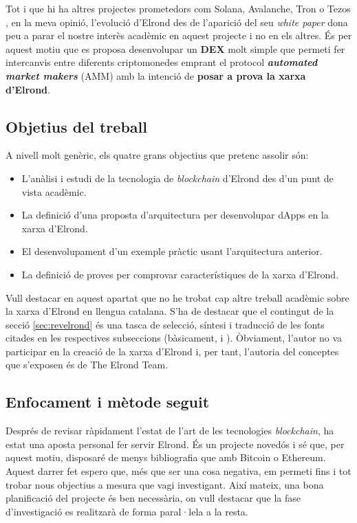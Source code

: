 \documentclass[11pt,a4paper]{article}
\begin{document}
Tot i que hi ha altres projectes prometedors com Solana, Avalanche, Tron o Tezos \cite{baro2021}, en la meva opinió, l'evolució d'Elrond des de l'aparició del seu \textit{white paper} dona peu a parar el nostre interès acadèmic en aquest projecte i no en els altres. És per aquest motiu que es proposa desenvolupar un \textbf{DEX} molt simple que permeti fer intercanvis entre diferents criptomonedes emprant el protocol \textbf{\textit{automated market makers}} (AMM) \cite{cryptopedia2021} amb la intenció de \textbf{posar a prova la xarxa d'Elrond}.

\subsection{Objetius del treball}\label{sub:objectius}
A nivell molt genèric, els quatre grans objectius que pretenc assolir són:
\begin{itemize}
    \item L'anàlisi i estudi de la tecnologia de \textit{blockchain} d'Elrond des d'un punt de vista acadèmic.
    \item La definició d'una proposta d'arquitectura per desenvolupar dApps en la xarxa d'Elrond.
    \item El desenvolupament d'un exemple pràctic usant l'arquitectura anterior.
    \item La definició de proves per comprovar característiques de la xarxa d'Elrond.
\end{itemize}

Vull destacar en aquest apartat que no he trobat cap altre treball acadèmic sobre la xarxa d'Elrond en llengua catalana. S'ha de destacar que el contingut de la secció \ref{sec:revelrond} és una tasca de selecció, síntesi i traducció de les fonts citades en les respectives subseccions (bàsicament, \cite{elrond2022} i \cite{elrond2019}). Òbviament, l'autor no va participar en la creació de la xarxa d'Elrond i, per tant, l'autoria del conceptes que s'exposen és de The Elrond Team. 

\subsection{Enfocament i mètode seguit}
Després de revisar ràpidament l'estat de l'art de les tecnologies \textit{blockchain}, ha estat una aposta personal fer servir Elrond. És un projecte novedós i sé que, per aquest motiu, disposaré de menys bibliografia que amb Bitcoin o Ethereum. Aquest darrer fet espero que, més que ser una cosa negativa, em permeti fins i tot trobar nous objectius a mesura que vagi investigant. Així mateix, una bona planificació del projecte és ben necessària, on vull destacar que la fase d'investigació es realitzarà de forma paral·lela a la resta.
\end{document}
